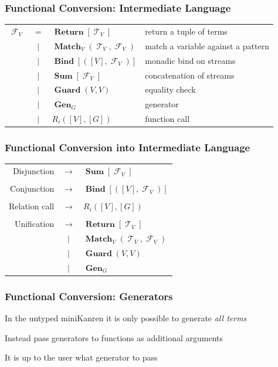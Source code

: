\documentclass[xcolor=table, aspectratio=169]{beamer}
\DeclareMathOperator{\Term}{\mathcal{T}}
\DeclareMathOperator{\Fun}{\mathcal{F}}
\DeclareMathOperator{\Rtrn}{\mathbf{Return}}
\DeclareMathOperator{\Bind}{\mathbf{Bind}}
\DeclareMathOperator{\Match}{\mathbf{Match}}
\DeclareMathOperator{\Sum}{\mathbf{Sum}}
\DeclareMathOperator{\Guard}{\mathbf{Guard}}
\DeclareMathOperator{\Gen}{\mathbf{Gen}}
\newcommand{\LIST}[1]{\left[ #1 \right]}
\begin{document}
\begin{frame}[fragile]
  \frametitle{Functional Conversion: Intermediate Language}
\begin{center}
\begin{tabular}{lcll}
    $\Fun_{V}$ & $=$ &  $\Rtrn \LIST{\Term_{V}}$ & return a tuple of terms\\
               & $\mid$ &  $\Match_{V} \left( \Term_{V}, \Fun_{V} \right)$& match a variable against a pattern\\
               & $\mid$ & $\Bind\LIST{\left(\LIST{V}, \Fun_{V}\right)} $ & monadic bind on streams\\
               & $\mid$ & $\Sum\LIST{\Fun_{V}}$ & concatenation of streams\\
               & $\mid$ & $\Guard\left( V, V \right)$ & equality check\\
               & $\mid$ & $\Gen_{G}$ & generator\\
               & $\mid$ & $R_{i}(\LIST{V}, \LIST{G})$ & function call
\end{tabular}
\end{center}
\end{frame}

\begin{frame}[fragile]
  \frametitle{Functional Conversion into Intermediate Language}
\begin{center}
\begin{tabular}{rcl}
  Disjunction   & $\rightarrow$ & $\Sum\LIST{\Fun_{V}}$ \\ && \\
  Conjunction   & $\rightarrow$ & $ \Bind\LIST{\left(\LIST{V}, \Fun_{V}\right)}$ \\ && \\
  Relation call & $\rightarrow$ & $ R_{i}(\LIST{V}, \LIST{G})$ \\ && \\
  Unification   & $\rightarrow$ & $\Rtrn \LIST{\Term_{V}}$ \\
                & $|$           & $\Match_{V} \left( \Term_{V}, \Fun_{V} \right)$ \\
                & $|$           & $\Guard\left( V, V \right)$ \\
                & $|$           & $\Gen_{G}$
\end{tabular}
\end{center}
\end{frame}

\begin{frame}[fragile]
  \frametitle{Functional Conversion: Generators}
\begin{center}
  In the untyped miniKanren it is only possible to generate \emph{all terms}
\end{center}

\vfill

\begin{center}
  Instead pass generators to functions as additional arguments


  It is up to the user what generator to pass
\end{center}


\end{frame}
\end{document}
